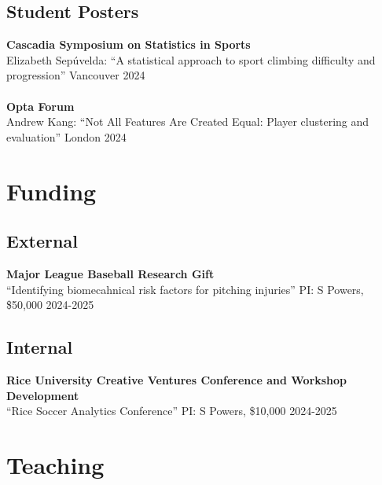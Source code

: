 \documentclass{article}
\begin{document}
\subsection*{\sc Student Posters}

{\bf Cascadia Symposium on Statistics in Sports}\\
Elizabeth Sep\'uvelda: ``A statistical approach to sport climbing difficulty and progression'' \hfill Vancouver 2024\\
~\\
{\bf Opta Forum}\\
Andrew Kang: ``Not All Features Are Created Equal: Player clustering and evaluation''  \hfill London 2024


\section*{\sc Funding}

\subsection*{\sc External}

{\bf Major League Baseball Research Gift}\\
``Identifying biomecahnical risk factors for pitching injuries'' PI: S Powers, \$50,000 \hfill 2024-2025

\subsection*{\sc Internal}

{\bf Rice University Creative Ventures Conference and Workshop Development}\\
``Rice Soccer Analytics Conference'' PI: S Powers, \$10,000 \hfill 2024-2025


\section*{\sc Teaching}
\end{document}
